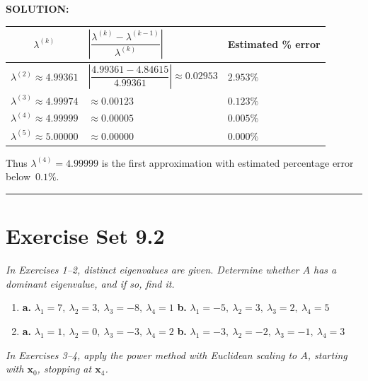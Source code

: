 \documentclass{article}
\begin{document}
\textbf{SOLUTION:}

\renewcommand{\arraystretch}{1.3}
\begin{center}
\begin{tabular}{|c|l|l|}
\hline
$\lambda^{(k)}$ &
$\left|\dfrac{\lambda^{(k)}-\lambda^{(k-1)}}{\lambda^{(k)}}\right|$ &
Estimated \% error \\
\hline
$\lambda^{(2)}\approx4.99361$ &
$\left|\dfrac{4.99361-4.84615}{4.99361}\right|\approx0.02953$ & $2.953\%$ \\
\hline
$\lambda^{(3)}\approx4.99974$ &
$\approx0.00123$ & $0.123\%$ \\
\hline
$\lambda^{(4)}\approx4.99999$ &
$\approx0.00005$ & $0.005\%$ \\
\hline
$\lambda^{(5)}\approx5.00000$ &
$\approx0.00000$ & $0.000\%$ \\
\hline
\end{tabular}
\end{center}

Thus $\lambda^{(4)}=4.99999$ is the first approximation with estimated percentage error
below~$0.1\%$.

\vspace{3mm}
\noindent\rule{\linewidth}{0.5pt}

\section*{Exercise Set 9.2}

\noindent\textit{In Exercises 1--2, distinct eigenvalues are given. Determine whether $A$
has a dominant eigenvalue, and if so, find it.}

\begin{enumerate}
  \item \textbf{a.} $\lambda_1=7,\ \lambda_2=3,\ \lambda_3=-8,\ \lambda_4=1$\quad
        \textbf{b.} $\lambda_1=-5,\ \lambda_2=3,\ \lambda_3=2,\ \lambda_4=5$

  \item \textbf{a.} $\lambda_1=1,\ \lambda_2=0,\ \lambda_3=-3,\ \lambda_4=2$\quad
        \textbf{b.} $\lambda_1=-3,\ \lambda_2=-2,\ \lambda_3=-1,\ \lambda_4=3$

\end{enumerate}

\noindent\textit{In Exercises 3--4, apply the power method with Euclidean scaling to $A$,
starting with $\mathbf{x}_0$, stopping at $\mathbf{x}_4$.}
\end{document}
